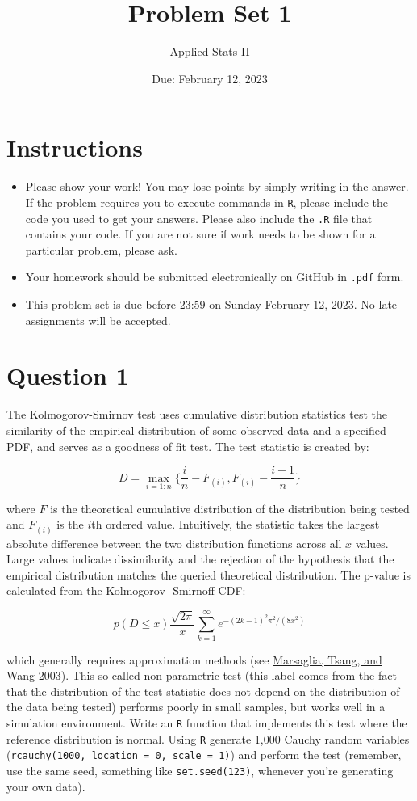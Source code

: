 \documentclass[12pt,letterpaper]{article}
\title{Problem Set 1}
\date{Due: February 12, 2023}
\author{Applied Stats II}
\begin{document}
	\maketitle
	\section*{Instructions}
	\begin{itemize}
	\item Please show your work! You may lose points by simply writing in the answer. If the problem requires you to execute commands in \texttt{R}, please include the code you used to get your answers. Please also include the \texttt{.R} file that contains your code. If you are not sure if work needs to be shown for a particular problem, please ask.
\item Your homework should be submitted electronically on GitHub in \texttt{.pdf} form.
\item This problem set is due before 23:59 on Sunday February 12, 2023. No late assignments will be accepted.
	\end{itemize}

	\vspace{.25cm}
\section*{Question 1} 
\vspace{.25cm}
\noindent The Kolmogorov-Smirnov test uses cumulative distribution statistics test the similarity of the empirical distribution of some observed data and a specified PDF, and serves as a goodness of fit test. The test statistic is created by:

$$D = \max_{i=1:n} \Big\{ \frac{i}{n}  - F_{(i)}, F_{(i)} - \frac{i-1}{n} \Big\}$$

\noindent where $F$ is the theoretical cumulative distribution of the distribution being tested and $F_{(i)}$ is the $i$th ordered value. Intuitively, the statistic takes the largest absolute difference between the two distribution functions across all $x$ values. Large values indicate dissimilarity and the rejection of the hypothesis that the empirical distribution matches the queried theoretical distribution. The p-value is calculated from the Kolmogorov-
Smirnoff CDF:

$$p(D \leq x) \frac{\sqrt {2\pi}}{x} \sum _{k=1}^{\infty }e^{-(2k-1)^{2}\pi ^{2}/(8x^{2})}$$


\noindent which generally requires approximation methods (see \href{https://core.ac.uk/download/pdf/25787785.pdf}{Marsaglia, Tsang, and Wang 2003}). This so-called non-parametric test (this label comes from the fact that the distribution of the test statistic does not depend on the distribution of the data being tested) performs poorly in small samples, but works well in a simulation environment. Write an \texttt{R} function that implements this test where the reference distribution is normal. Using \texttt{R} generate 1,000 Cauchy random variables (\texttt{rcauchy(1000, location = 0, scale = 1)}) and perform the test (remember, use the same seed, something like \texttt{set.seed(123)}, whenever you're generating your own data).\\
	
\end{document}
